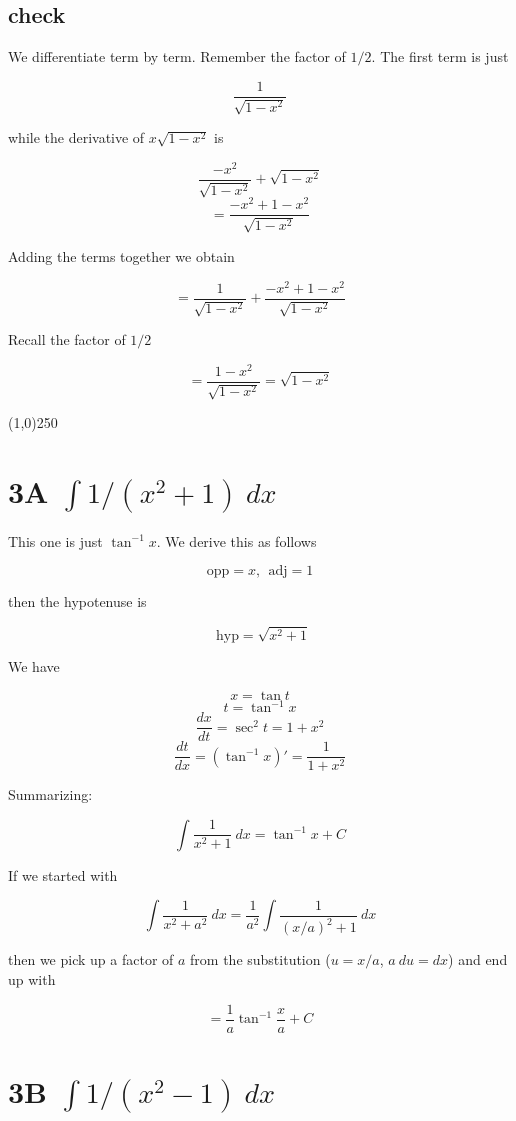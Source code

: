 \documentclass[11pt, oneside]{article}
\begin{document}
\subsection*{check}

We differentiate term by term.  Remember the factor of $1/2$.  The first term is just

\[ \frac{1}{\sqrt{1-x^2}} \]

while the derivative of $x \sqrt{1-x^2}$  is

\[ \frac{-x^2}{\sqrt{1-x^2}} + \sqrt{1-x^2} \]
\[ = \frac{-x^2 + 1 - x^2}{\sqrt{1-x^2}}  \]

Adding the terms together we obtain

\[ = \frac{1}{\sqrt{1-x^2}} + \frac{-x^2 + 1 - x^2}{\sqrt{1-x^2}}  \]

Recall the factor of $1/2$

\[ = \frac{1-x^2}{\sqrt{1-x^2}} = \sqrt{1-x^2} \]

\begin{center} \line(1,0){250} \end{center}

\section*{3A $\int 1/(x^2 + 1) \ dx$}

This one is just $\tan^{-1} x$.  We derive this as follows

\[ \text{opp} = x, \ \ \text{adj} = 1 \]

then the hypotenuse is

\[ \ \ \text{hyp} = \sqrt{x^2 + 1}   \]

We have 

\[ x = \tan t \]
\[ t = \tan^{-1} x \]
\[ \frac{dx}{dt} = \sec^2 t = 1 + x^2 \]
\[ \frac{dt}{dx} = (\tan^{-1} x)' = \frac{1}{1 + x^2} \]

Summarizing:

\[ \int \frac{1}{x^2 + 1} \ dx = \tan^{-1} x  + C \]

If we started with

\[ \int \frac{1}{x^2 + a^2} \ dx = \frac{1}{a^2} \int \frac{1}{(x/a)^2 + 1} \ dx \]

then we pick up a factor of $a$ from the substitution ($u=x/a$, $a\ du=dx$) and end up with

\[ = \frac{1}{a} \tan^{-1} \frac{x}{a}  + C \]

\section*{3B $\int 1/(x^2 - 1) \ dx$}
\end{document}

